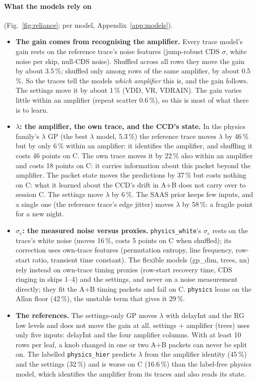 \paragraph{What the models rely on} (Fig.~\ref{fig:reliance}; per model, Appendix~\ref{app:models}).
\begin{itemize}
\item \textbf{The gain comes from recognising the amplifier.} Every trace model's gain rests on the reference trace's
  noise features (jump-robust CDS $\sigma$, white noise per skip, null-CDS noise). Shuffled across all rows they move
  the gain by about 3.5\,\%; shuffled only among rows of the same amplifier, by about 0.5\,\%. So the traces tell the
  models \emph{which amplifier} this is, and the gain follows. The settings move it by about 1\,\% (VDD, VR, VDRAIN). The
  gain varies little within an amplifier (repeat scatter 0.6\,\%), so this is most of what there is to learn.
\item \textbf{$\lambda$: the amplifier, the own trace, and the CCD's state.} In the physics family's $\lambda$ GP (the
  best $\lambda$ model, 5.3\,\%) the reference trace moves $\lambda$ by 46\,\% but by only 6\,\% within an amplifier: it
  identifies the amplifier, and shuffling it costs 46 points on C. The own trace moves it by 22\,\% also within an
  amplifier and costs 18 points on C: it carries information about this packet beyond the amplifier. The packet state
  moves the predictions by 37\,\% but costs nothing on C: what it learned about the CCD's drift in A+B does not carry
  over to session C. The settings move $\lambda$ by 6\,\%. The SAAS prior keeps few inputs, and a single one (the
  reference trace's edge jitter) moves $\lambda$ by 58\,\%: a fragile point for a new night.
\item \textbf{$\sigma_e$: the measured noise versus proxies.} \texttt{physics\_white}'s $\sigma_e$ rests on the trace's
  white noise (moves 16\,\%, costs 5 points on C when shuffled); its correction uses own-trace features
  (permutation entropy, line frequency, row-start ratio, transient time constant). The flexible models (gp\_dim,
  trees, nn) rely instead on own-trace timing proxies (row-start recovery time, CDS ringing in skips 1--4) and the
  settings, and never on a noise measurement directly; they fit the A+B timing packets and fail on C. \texttt{physics}
  leans on the Allan floor (42\,\%), the unstable term that gives it 29\,\%.
\item \textbf{The references.} The settings-only GP moves $\lambda$ with delayInt and the RG low levels and does not
  move the gain at all. settings + amplifier (trees) uses only five inputs: delayInt and the four amplifier columns.
  With at least 10 rows per leaf, a knob changed in one or two A+B packets can never be split on. The labelled
  \texttt{physics\_hier} predicts $\lambda$ from the amplifier identity (45\,\%) and the settings (32\,\%) and is worse on C
  (16.6\,\%) than the label-free physics model, which identifies the amplifier from its traces and also reads its state.
\end{itemize}

